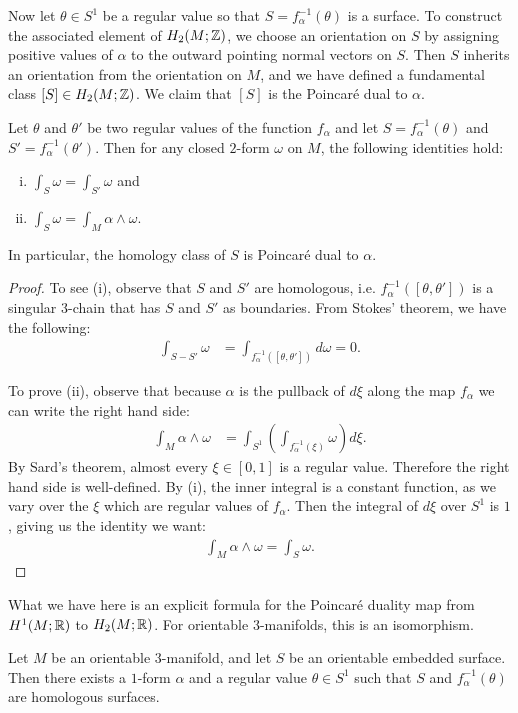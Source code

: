 Now let $\theta \in S^1$ be a regular value so that $S = f^{-1}_{\alpha}(\theta)$ is a surface.
To construct the associated element of $H_2(M;\mathbb{Z})$, we choose an orientation on $S$ by assigning positive values of $\alpha$ to the outward pointing normal vectors on $S$.
Then $S$ inherits an orientation from the orientation on $M$, and we have defined a
fundamental class $[S]\in H_2(M;\mathbb{Z})$.
We claim that $[S]$ is the Poincar\'e dual to $\alpha$.
\begin{lem}
  \label{lem:poincare-duality}
  Let $\theta$ and $\theta'$ be two regular values of the function $f_{\alpha}$ and let $S=f_\alpha^{-1}(\theta)$ and $S'=f_\alpha^{-1}(\theta')$.
  Then for any closed $2$-form $\omega$ on $M$, the following identities hold:
  \begin{enumerate}[(i)]
  \item $\displaystyle
    \int_{S} \omega = \displaystyle\int_{S'} \omega$ and
 \item $\displaystyle
    \int_S \omega = \displaystyle\int_M \alpha \wedge \omega.$
  \end{enumerate}
  In particular, the homology class of $S$ is Poincar\'e dual to $\alpha$.
\end{lem}
\begin{proof}
  To see (i), observe that $S$ and $S'$ are homologous, i.e. $f^{-1}_{\alpha}([\theta, \theta'])$ is a singular $3$-chain that has $S$ and $S'$ as boundaries.
  From Stokes' theorem, we have the following:
  \begin{align*}
    \int_{S - S'} \omega &= \int_{f_{\alpha}^{-1}([\theta, \theta'])} d\omega
                         = 0.
  \end{align*}

  To prove (ii), observe that because $\alpha$ is the pullback of $d\xi$ along the map $f_{\alpha}$ we can write the right hand side:
  \begin{align*}
    \int_M \alpha \wedge \omega &= \int_{S^1} \left(   \int_{f_{\alpha}^{-1}(\xi)} \omega \right) d\xi.
  \end{align*}
  By Sard's theorem, almost every $\xi \in [0,1]$ is a regular value.  Therefore the right hand side is well-defined.
  By (i), the inner integral is a constant function, as we vary over the $\xi$ which are regular values of $f_{\alpha}$.
  Then the integral of $d\xi$ over $S^1$ is $1$, giving us the identity we want:
  \begin{align*}
    \int_M \alpha \wedge \omega = \int_S \omega.
  \end{align*}
\end{proof}
What we have here is an explicit formula for the Poincar\'e duality map from $H^1(M; \mathbb{R})$ to $H_2(M; \mathbb{R})$.
For orientable $3$-manifolds, this is an isomorphism.%
\begin{thm}
  \label{thm:orientable-poincare-duality}
  Let $M$ be an orientable $3$-manifold, and let $S$ be an orientable embedded surface. Then there exists a $1$-form
  $\alpha$ and a regular value $\theta \in S^1$ such that $S$ and $f_{\alpha}^{-1}(\theta)$ are homologous surfaces.
\end{thm}

